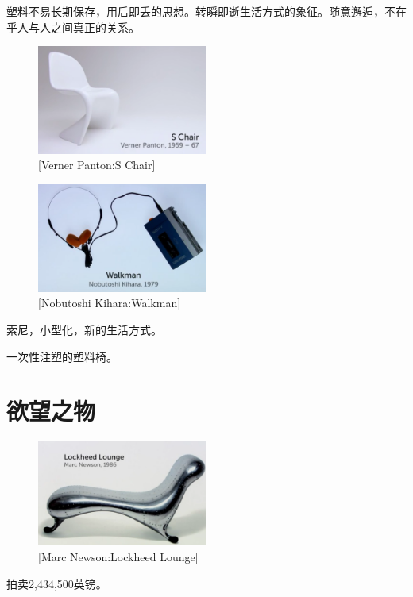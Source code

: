 \documentclass[UTF8]{../../../../RepresentationUniverse}
\begin{document}
塑料不易长期保存，用后即丢的思想。转瞬即逝生活方式的象征。随意邂逅，不在乎人与人之间真正的关系。

\begin{figure}[h]
    \centering
    \includegraphics[width=0.5\textwidth]{./src/figures/S Chair_2023-04-09_20-54-06.png}
    \caption{[Verner Panton:S Chair]}
    \label{figure:S Chair}
\end{figure}


\begin{figure}[h]
    \centering
    \includegraphics[width=0.5\textwidth]{./src/figures/Walkman_2023-04-09_20-59-42.png}
    \caption{[Nobutoshi Kihara:Walkman]}
    \label{figure:Walkman}
\end{figure}
索尼，小型化，新的生活方式。

一次性注塑的塑料椅。


\chapter{欲望之物}


\begin{figure}[h]
    \centering
    \includegraphics[width=0.5\textwidth]{./src/figures/Lockheed Lounge_2023-04-09_21-08-42.png}
    \caption{[Marc Newson:Lockheed Lounge]}
    \label{figure:Lockheed Lounge}
\end{figure}
拍卖2,434,500英镑。
\end{document}
